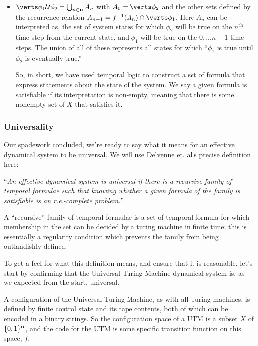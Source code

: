 \documentclass{fkpaper}
\newcommand{\ltil}{\mathcal{U}}
\begin{document}
\begin{multicols}{2}
\begin{itemize}
  \item $\abs{\phi_1 \ltil \phi_2} = \bigcup_{n \in \Nn} A_n$ with $A_0 = \abs{\phi_2}$ and the other sets defined by the recurrence relation $A_{n+1} = f^{-1}(A_n)\cap\abs{\phi_1}$. Here $A_n$ can be interpreted as, the set of system states for which $\phi_2$ will be true on the $n^{\text{th}}$ time step from the current state, and $\phi_1$ will be true on the $0,...n-1$ time steps. The union of all of these represents all states for which ``$\phi_1$ is true until $\phi_2$ is eventually true.''

    So, in short, we have used temporal logic to construct a set of formula that express statements about the state of the system. We say a given formula is satisfiable if its interpretation is non-empty, meaning that there is some nonempty set of $X$ that satisfies it.

\end{itemize}


\subsubsection*{Universality}

Our spadework concluded, we're ready to say what it means for an effective dynamical system to be universal. We will use Delvenne et. al's precise definition here:

``{\it An effective dynamical system is \emph{universal} if there is a recursive family of temporal formulae such that knowing whether a given formula of the family is satisfiable is an r.e.-complete problem.}''

A ``recursive'' family of temporal formulae is a set of temporal formula for which membership in the set can be decided by a turing machine in finite time; this is essentially a regularity condition which prevents the family from being outlandishly defined.

To get a feel for what this definition means, and ensure that it is reasonable, let's start by confirming that the Universal Turing Machine dynamical system  is, as we expected from the start, universal.

A configuration of the Universal Turing Machine, as with all Turing machines, is defined by finite control state and its tape contents, both of which can be encoded in a binary strings. So the configuration space of a UTM is a subset $X$ of $\{0,1\}^{\mathbf{n}}$, and the code for the UTM is some specific transition function on this space, $f$.









\end{multicols}
\end{document}
